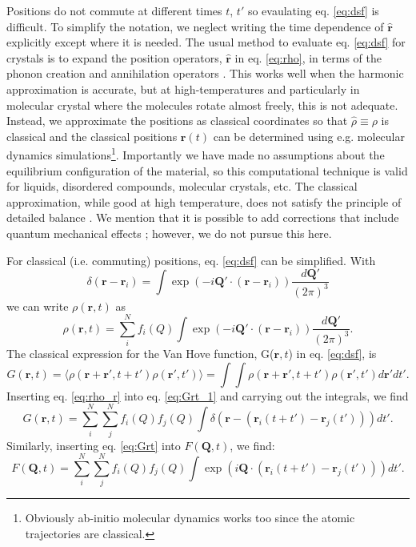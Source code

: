 \documentclass[11pt,prb,aps,nofootinbib,superscriptaddress,floatfix]{revtex4-2}
\begin{document}
Positions do not commute at different times $t$, $t'$ so evaulating eq. \ref{eq:dsf} is difficult. To simplify the notation, we neglect writing the time dependence of $\hat{\bm{r}}$ explicitly except where it is needed. The usual method to evaluate eq. \ref{eq:dsf} for crystals is to expand the position operators, $\hat{\bm{r}}$ in eq. \ref{eq:rho}, in terms of the phonon creation and annihilation operators \cite{squires1996introduction}. This works well when the harmonic approximation is accurate, but at high-temperatures and particularly in molecular crystal where the molecules rotate almost freely, this is not adequate. Instead, we approximate the positions as classical coordinates so that $\hat{\rho} \equiv \rho$ is classical and the classical positions $\bm{r}(t)$ can be determined using e.g. molecular dynamics simulations\footnote{Obviously ab-initio molecular dynamics works too since the atomic trajectories are classical.}. Importantly we have made no assumptions about the equilibrium configuration of the material, so this computational technique is valid for liquids, disordered compounds, molecular crystals, etc. The classical approximation, while good at high temperature, does not satisfy the principle of detailed balance \cite{squires1996introduction,dove1993introduction,harrelson2021computing}. We mention that it is possible to add corrections that include quantum mechanical effects \cite{harrelson2021computing}; however, we do not pursue this here. 

For classical (i.e. commuting) positions, eq. \ref{eq:dsf} can be simplified. With
\begin{equation}
    \delta(\bm{r}-\bm{r}_i)=\int{\exp(-i\bm{Q}'\cdot(\bm{r}-\bm{r}_i))}\frac{d\bm{Q}'}{(2\pi)^3}
\end{equation}
we can write $\rho(\bm{r},t)$ as
\begin{equation}
    \rho(\bm{r},t)=\sum_i^N f_i(Q)\int{\exp(-i\bm{Q}'\cdot(\bm{r}-\bm{r}_i))} \frac{d\bm{Q}'}{(2\pi)^3}.
    \label{eq:rho_r}
\end{equation}
The classical expression for the Van Hove function, G($\bm{r},t$) in eq. \ref{eq:dsf}, is
\begin{equation}
    G(\bm{r},t) = \langle \rho (\bm{r}+\bm{r}',t+t') \rho (\bm{r}',t') \rangle = \int \int \rho (\bm{r}+\bm{r}',t+t') \rho (\bm{r}',t') d\bm{r}'dt'.
    \label{eq:Grt_1}
\end{equation}
Inserting eq. \ref{eq:rho_r} into eq. \ref{eq:Grt_1} and carrying out the integrals, we find
\begin{equation}
    G(\bm{r},t)=\sum_i^N \sum_j^N f_i(Q) f_j(Q) \int  \delta(\bm{r}-(\bm{r}_i(t+t')-\bm{r}_j(t'))) dt' .
    \label{eq:Grt}
\end{equation}
Similarly, inserting eq. \ref{eq:Grt} into $F(\bm{Q},t)$, we find:
\begin{equation}
    F(\bm{Q},t) = \sum_i^N \sum_j^N f_i(Q) f_j(Q) \int \exp (i\bm{Q}\cdot(\bm{r}_i(t+t')-\bm{r}_j(t'))) dt'.
    \label{eq:FQt}
\end{equation}
\end{document}
